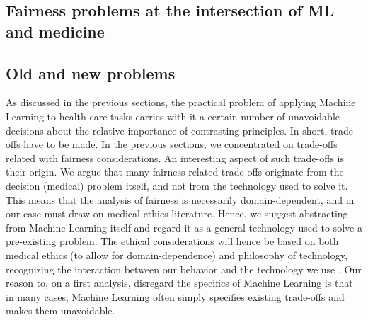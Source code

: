 \subsection{Fairness problems at the intersection of ML and medicine}



\subsection{Old and new problems}
    As discussed in the previous sections, the practical problem of applying Machine Learning to health care tasks carries with it a certain number of unavoidable decisions about the relative importance of contrasting principles.
    In short, trade-offs have to be made.
    In the previous sections, we concentrated on trade-offs related with fairness considerations.
    An interesting aspect of such trade-offs is their origin.
    We argue that many fairness-related trade-offs originate from the decision (medical) problem itself, and not from the technology used to solve it.
    This means that the analysis of fairness is necessarily domain-dependent, and in our case must draw on medical ethics literature.
    Hence, we suggest abstracting from Machine Learning itself and regard it as a general technology used to solve a pre-existing problem.
    The ethical considerations will hence be based on both medical ethics (to allow for domain-dependence) and philosophy of technology, recognizing the interaction between our behavior and the technology we use \cite{Dijkstra2020}.
    Our reason to, on a first analysis, disregard the specifics of Machine Learning is that in many cases, Machine Learning often simply specifies existing trade-offs and makes them unavoidable.

